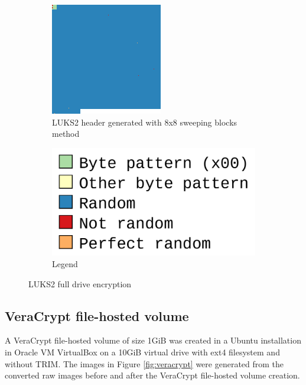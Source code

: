 \documentclass[
  digital, %
  color,   %
  oneside, %
  lof,     %
  nolot,     %
]{fithesis4}
\begin{document}
\begin{figure}
\begin{subfigure}[t]{.45\textwidth}
    \includegraphics[width=\textwidth,interpolate=false]{ext4-luks2-head.png}
    \caption{LUKS2 header generated with 8x8 sweeping blocks method}
    \label{fig:luks-full}
  \end{subfigure}
  \begin{subfigure}[b]{.45\textwidth}
    \centering
    \includegraphics[width=\textwidth]{legend.png}
    \caption{Legend}
    \label{fig:luks-legend} 
  \end{subfigure}
  \caption{LUKS2 full drive encryption}
  \label{fig:luks-header}
\end{figure}

\subsection{VeraCrypt file-hosted volume}
\label{ssec:veracrypt-file-hosted-volume}
A VeraCrypt file-hosted volume of size 1GiB was created in a Ubuntu installation in Oracle VM VirtualBox on a 10GiB virtual drive with ext4 filesystem and without TRIM.
The images in Figure \ref{fig:veracrypt} were generated from the converted raw images before and after the VeraCrypt file-hosted volume\cite{veracryptvol} creation.
\end{document}
